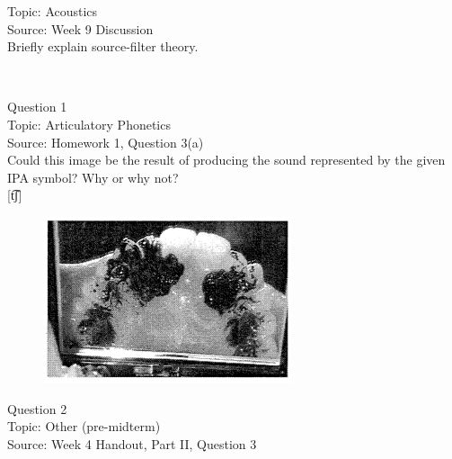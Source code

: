 \documentclass[12pt]{article}
\begin{document}
Topic: Acoustics\\
Source: Week 9 Discussion\\

Briefly explain source-filter theory.\\


\newpage

\begin{center}
\textbf{{\color{red}{\HUGE END OF EXAM}}}\\

\end{center}
\newpage

\begin{center}
\textbf{{\color{blue}{\HUGE START OF EXAM\\}}}

\textbf{{\color{blue}{\HUGE Student ID: 56149\\}}}

\textbf{{\color{blue}{\HUGE 4:30\\}}}

\end{center}
\newpage

{\large Question 1}\\

Topic: Articulatory Phonetics\\
Source: Homework 1, Question 3(a)\\

Could this image be the result of producing the sound represented by the given IPA symbol? Why or why not?\\

{[t͡ʃ]}

\begin{figure}[H]
\includegraphics{../images/staticpalatography_fricative.png}
\end{figure}

\newpage

{\large Question 2}\\

Topic: Other (pre-midterm)\\
Source: Week 4 Handout, Part II, Question 3\\
\end{document}
